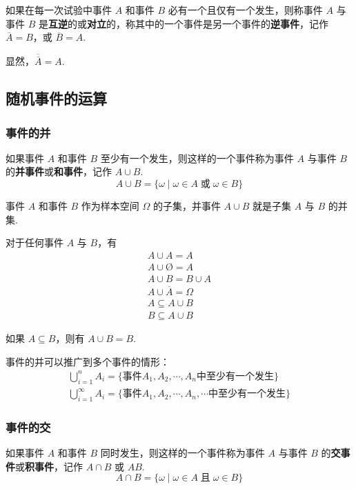 如果在每一次试验中事件 $A$ 和事件 $B$ 必有一个且仅有一个发生，则称事件 $A$ 与事件 $B$ 是\textbf{互逆}的或\textbf{对立}的，称其中的一个事件是另一个事件的\textbf{逆事件}，记作 $\overline{A}=B$，或 $\overline{B}=A$.

显然，$\overline{\overline{A}}=A$.

\subsection{随机事件的运算}

\subsubsection{事件的并}

如果事件 $A$ 和事件 $B$ 至少有一个发生，则这样的一个事件称为事件 $A$ 与事件 $B$ 的\textbf{并事件}或\textbf{和事件}，记作 $A \cup B$.
$$
A \cup B = \{ \omega \mid \omega \in A \;\text{或}\; \omega \in B \}
$$

事件 $A$ 和事件 $B$ 作为样本空间 $\varOmega$ 的子集，并事件 $A \cup B$ 就是子集 $A$ 与 $B$ 的并集.

对于任何事件 $A$ 与 $B$，有
\begin{gather*}
    A \cup A = A \\
    A \cup \text{\O} = A \\
    A \cup B = B \cup A \\
    A \cup \overline{A} = \varOmega \\
    A \subseteq A \cup B \\
    B \subseteq A \cup B
\end{gather*}

如果 $A \subseteq B$，则有 $A \cup B=B$.

事件的并可以推广到多个事件的情形：
\begin{gather*}
    \bigcup_{i=1}^n A_i = \{ \text{事件} A_1,A_2,\cdots,A_n \text{中至少有一个发生} \} \\
    \bigcup_{i=1}^\infty A_i = \{ \text{事件} A_1,A_2,\cdots,A_n,\cdots \text{中至少有一个发生} \}
\end{gather*}

\subsubsection{事件的交}

如果事件 $A$ 和事件 $B$ 同时发生，则这样的一个事件称为事件 $A$ 与事件 $B$ 的\textbf{交事件}或\textbf{积事件}，记作 $A \cap B$ 或 $AB$.
$$
A \cap B = \{ \omega \mid \omega \in A \;\text{且}\; \omega \in B \}
$$

